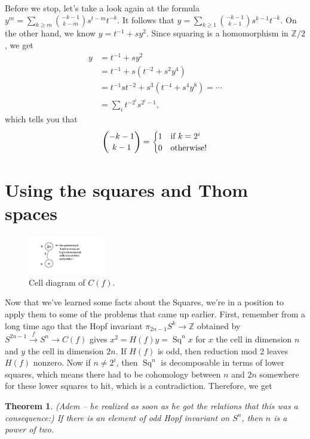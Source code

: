 \documentclass{article}
\newcommand{\Z}{\mathbb{Z}}
\DeclareMathOperator{\Sq}{Sq}
\newtheorem{thm}{Theorem}[section]
\begin{document}
Before we stop, let's take a look again at the formula $y^m = \sum_{k \ge m} \binom{-k-1}{k-m} s^{t-m} t^{-k}$.  It follows that $y = \sum_{k \ge 1} \binom{-k-1}{k-1} s^{k-1} t^{-k}$.  On the other hand, we know $y = t^{-1} + sy^2$.  Since squaring is a homomorphism in $\Z/2$, we get
\begin{align*}
y & = t^{-1} + sy^2 \\
& = t^{-1} + s(t^{-2} + s^2 y^4) \\
& = t^{-1} st^{-2} + s^3(t^{-4} + s^4y^8) = \cdots \\
& = \sum_i t^{-2^i} s^{2^i-1},
\end{align*}
which tells you that
\[
\binom{-k-1}{k-1} = \begin{cases} 1 & \hbox{if $k = 2^i$} \\ 0 & \hbox{otherwise!} \end{cases}
\]


\section{Using the squares and Thom spaces} %

\begin{figure}
\centering\includegraphics[width=0.3\textwidth]{figures/11.pdf}
\caption{\small Cell diagram of $C(f)$.}
\end{figure}
Now that we've learned some facts about the Squares, we're in a position to apply them to some of the problems that came up earlier.  First, remember from a long time ago that the Hopf invariant $\pi_{2n-1}S^k \to \Z$ obtained by $S^{2n-1} \stackrel{f}{\to} S^n \to C(f)$ gives $x^2 = H(f)y = \Sq^n x$ for $x$ the cell in dimension $n$ and $y$ the cell in dimension $2n$.  If $H(f)$ is odd, then reduction mod 2 leaves $H(f)$ nonzero.  Now if $n \ne 2^i$, then $\Sq^n$ is decomposable in terms of lower squares, which means there had to be cohomology between $n$ and $2n$ somewhere for these lower squares to hit, which is a contradiction.  Therefore, we get
\begin{thm} (Adem -- he realized as soon as he got the relations that this was a consequence:)
If there is an element of odd Hopf invariant on $S^n$, then $n$ is a power of two.
\end{thm}
\end{document}
